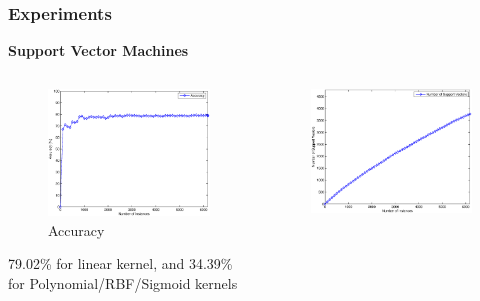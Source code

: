 \documentclass[xcolor=table]{beamer}
\begin{document}
    \begin{frame}
        \frametitle{Experiments}
        \begin{center}
            \textbf{Support Vector Machines}
        \end{center}
        \begin{columns}
            \begin{column}{0.5\textwidth}
                \begin{figure}
                    \centering
                    \includegraphics[width=\textwidth]{figures/svm_accuracy.eps}
                    \caption{Accuracy}
                \end{figure}
                \begin{center}
                    \small 79.02\% for linear kernel, and 34.39\% for Polynomial/RBF/Sigmoid kernels
                \end{center}
            \end{column}
            \begin{column}{0.5\textwidth}
                \begin{figure}
                    \centering
                    \includegraphics[width=\textwidth]{figures/svm_n_sv.eps}

\end{figure}
\end{column}
\end{columns}
\end{frame}
\end{document}
